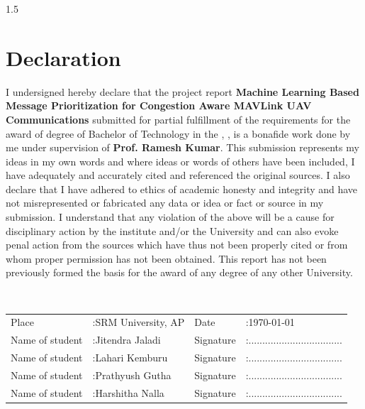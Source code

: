 \thispagestyle{empty}

\begin{spacing}{1.5}
\chapter*{Declaration}
%
I undersigned hereby declare that the project report 
{\bfseries Machine Learning Based Message Prioritization for Congestion Aware MAVLink UAV Communications} submitted for
partial fulfillment of the requirements for the award of degree of Bachelor of Technology in the {\vdept}, {\vcollege}, is a bonafide work done by me under supervision of \textbf{Prof. Ramesh Kumar}. This submission represents my ideas in my own words and where ideas or words of others have been included, I have adequately and accurately cited and referenced the original sources. I also declare that I have
adhered to ethics of academic honesty and integrity and have not misrepresented or fabricated any data or idea or fact or source in my submission. I understand that any violation of the above will be a cause for disciplinary action by the institute and/or the University and can also evoke penal action from the sources which have thus not been properly cited or from whom proper permission has not been obtained. This report has not been previously formed the basis for the award of any degree of any other University. 

\qquad\\[3cm]
\begin{tabular}{llll}
Place&:\enspace SRM University, AP\qquad & Date&:\enspace\today \\
Name of student &:\enspace Jitendra Jaladi & Signature       &:\enspace  .................................. \\
Name of student &:\enspace Lahari Kemburu & Signature       &:\enspace  .................................. \\
Name of student &:\enspace Prathyush Gutha & Signature       &:\enspace  .................................. \\
Name of student &:\enspace Harshitha Nalla & Signature       &:\enspace  .................................. \\
\end{tabular}

\end{spacing}  